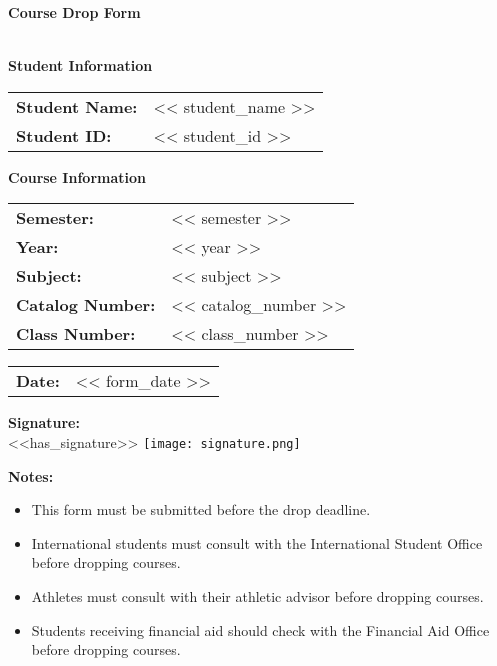 \documentclass[12pt]{article}
\begin{document}
\begin{center}
    \LARGE\textbf{Course Drop Form}\\[0.5cm]
    
    \\[1cm]
\end{center}

\noindent\textbf{Student Information}\\[0.3cm]
\noindent\begin{tabular}{@{}p{4cm}p{12cm}@{}}
\textbf{Student Name:} & << student_name >> \\[0.3cm]
\textbf{Student ID:} & << student_id >> \\[0.3cm]
\end{tabular}

\vspace{1cm}
\noindent\textbf{Course Information}\\[0.3cm]
\noindent\begin{tabular}{@{}p{4cm}p{12cm}@{}}
\textbf{Semester:} & << semester >> \\[0.3cm]
\textbf{Year:} & << year >> \\[0.3cm]
\textbf{Subject:} & << subject >> \\[0.3cm]
\textbf{Catalog Number:} & << catalog_number >> \\[0.3cm]
\textbf{Class Number:} & << class_number >> \\[0.3cm]
\end{tabular}

\vspace{1cm}
\noindent\begin{tabular}{@{}p{4cm}p{12cm}@{}}
\textbf{Date:} & << form_date >> \\[0.3cm]
\end{tabular}

\vspace{1cm}
\noindent\textbf{Signature:}\\[0.3cm]
\ifx\relax<<has_signature>>\relax
    \fbox{\parbox{8cm}{\vspace{2cm}\hspace{7cm}}}
\else
    \texttt{[image: signature.png]}
\fi

\vspace{2cm}

\vspace{1cm}
\noindent\textbf{Notes:}
\begin{itemize}
    \item This form must be submitted before the drop deadline.
    \item International students must consult with the International Student Office before dropping courses.
    \item Athletes must consult with their athletic advisor before dropping courses.
    \item Students receiving financial aid should check with the Financial Aid Office before dropping courses.
\end{itemize}
\end{document}
